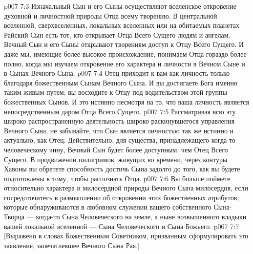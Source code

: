 \vs p007 7:3 Изначальный Сын и его Сыны осуществляют вселенское откровение духовной и личностной природы Отца всему творению. В центральной вселенной, сверхвселенных, локальных вселенных или на обитаемых планетах Райский Сын есть тот, кто открывает Отца Всего Сущего людям и ангелам. Вечный Сын и его Сыны открывают творениям доступ к Отцу Всего Сущего. И даже мы, имеющие более высокое происхождение, понимаем Отца гораздо более полно, когда мы изучаем откровение его характера и личности в Вечном Сыне и в Сынах Вечного Сына.
\vs p007 7:4 Отец приходит к вам как личность только благодаря божественным Сынам Вечного Сына. И вы достигаете Бога именно таким живым путем; вы восходите к Отцу под водительством этой группы божественных Сынов. И это истинно несмотря на то, что ваша личность является непосредственным даром Отца Всего Сущего.
\vs p007 7:5 \pc Рассматривая всю эту широко распространенную деятельность широко раскинувшегося управления Вечного Сына, не забывайте, что Сын является личностью так же истинно и актуально, как Отец. Действительно, для существа, принадлежащего когда\hyp{}то человеческому чину, Вечный Сын будет более доступным, чем Отец Всего Сущего. В продвижении пилигримов, живущих во времени, через контуры Хавоны вы обретете способность достичь Сына задолго до того, как вы будете подготовлены к тому, чтобы распознать Отца.
\vs p007 7:6 Вы больше поймете относительно характера и милосердной природы Вечного Сына милосердия, если сосредоточитесь в размышлении об откровении этих божественных атрибутов, которые обнаруживаются в любовном служении вашего собственного Сына\hyp{}Творца --- когда\hyp{}то Сына Человеческого на земле, а ныне возвышенного владыки вашей локальной вселенной --- Сына Человеческого и Сына Божьего.
\vsetoff
\vs p007 7:7 [Выражено в словах Божественным Советником, призванным сформулировать это заявление, запечатлевшее Вечного Сына Рая.]
